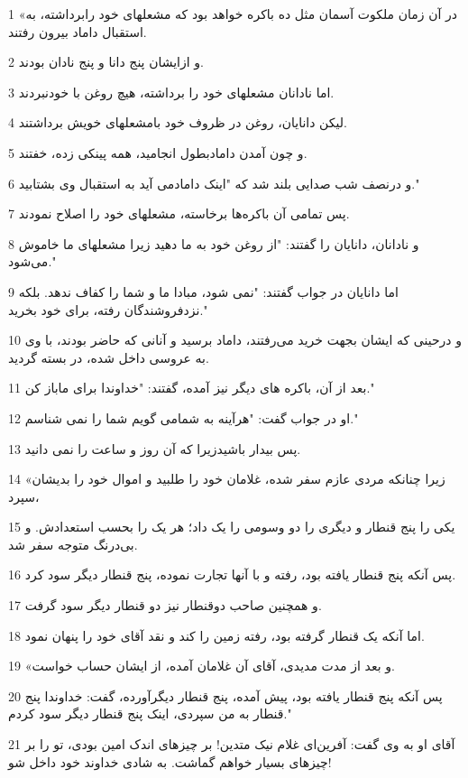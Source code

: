 \par 1 «در آن زمان ملکوت آسمان مثل ده باکره خواهد بود که مشعلهای خود رابرداشته، به استقبال داماد بیرون رفتند.
\par 2 و ازایشان پنج دانا و پنج نادان بودند.
\par 3 اما نادانان مشعلهای خود را برداشته، هیچ روغن با خودنبردند.
\par 4 لیکن دانایان، روغن در ظروف خود بامشعلهای خویش برداشتند.
\par 5 و چون آمدن دامادبطول انجامید، همه پینکی زده، خفتند.
\par 6 و درنصف شب صدایی بلند شد که "اینک دامادمی آید به استقبال وی بشتابید."
\par 7 پس تمامی آن باکره‌ها برخاسته، مشعلهای خود را اصلاح نمودند.
\par 8 و نادانان، دانایان را گفتند: "از روغن خود به ما دهید زیرا مشعلهای ما خاموش می‌شود."
\par 9 اما دانایان در جواب گفتند: "نمی شود، مبادا ما و شما را کفاف ندهد. بلکه نزدفروشندگان رفته، برای خود بخرید."
\par 10 و درحینی که ایشان بجهت خرید می‌رفتند، داماد برسید و آنانی که حاضر بودند، با وی به عروسی داخل شده، در بسته گردید.
\par 11 بعد از آن، باکره های دیگر نیز آمده، گفتند: "خداوندا برای ماباز کن."
\par 12 او در جواب گفت: "هرآینه به شمامی گویم شما را نمی شناسم."
\par 13 پس بیدار باشیدزیرا که آن روز و ساعت را نمی دانید.
\par 14 «زیرا چنانکه مردی عازم سفر شده، غلامان خود را طلبید و اموال خود را بدیشان سپرد،
\par 15 یکی را پنج قنطار و دیگری را دو وسومی را یک داد؛ هر یک را بحسب استعدادش. و بی‌درنگ متوجه سفر شد.
\par 16 پس آنکه پنج قنطار یافته بود، رفته و با آنها تجارت نموده، پنج قنطار دیگر سود کرد.
\par 17 و همچنین صاحب دوقنطار نیز دو قنطار دیگر سود گرفت.
\par 18 اما آنکه یک قنطار گرفته بود، رفته زمین را کند و نقد آقای خود را پنهان نمود.
\par 19 «و بعد از مدت مدیدی، آقای آن غلامان آمده، از ایشان حساب خواست.
\par 20 پس آنکه پنج قنطار یافته بود، پیش آمده، پنج قنطار دیگرآورده، گفت: خداوندا پنج قنطار به من سپردی، اینک پنج قنطار دیگر سود کردم."
\par 21 آقای او به وی گفت: آفرین‌ای غلام نیک متدین! بر چیزهای اندک امین بودی، تو را بر چیزهای بسیار خواهم گماشت. به شادی خداوند خود داخل شو!
